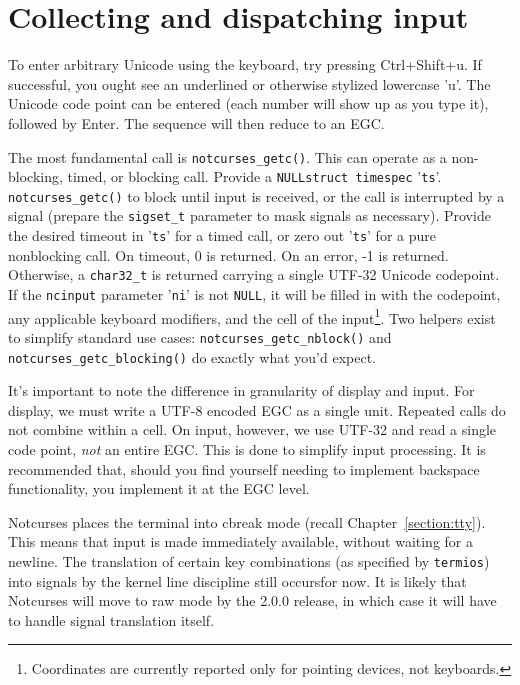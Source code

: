 \section{Collecting and dispatching input}
\label{sec:input}

To enter arbitrary Unicode using the keyboard, try pressing Ctrl+Shift+u. If
successful, you ought see an underlined or otherwise stylized lowercase 'u'.
The Unicode code point can be entered (each number will show up as you type it),
followed by Enter. The sequence will then reduce to an EGC.

The most fundamental call is \texttt{notcurses\_getc()}. This can operate as a
non-blocking, timed, or blocking call. Provide a \texttt{NULL}\texttt{struct timespec} '\texttt{ts}'.
\texttt{notcurses\_getc()} to block until input is received, or the call is
interrupted by a signal (prepare the \texttt{sigset\_t} parameter to mask signals
as necessary). Provide the desired timeout in '\texttt{ts}' for a timed call,
or zero out '\texttt{ts}' for a pure nonblocking call. On timeout, 0 is returned.
On an error, -1 is returned. Otherwise, a \texttt{char32\_t} is returned carrying
a single UTF-32 Unicode codepoint. If the \texttt{ncinput} parameter '\texttt{ni}'
is not \texttt{NULL}, it will be filled in with the codepoint, any applicable
keyboard modifiers, and the cell of the input\footnote{Coordinates are currently
reported only for pointing devices, not keyboards.}. Two helpers exist to simplify
standard use cases: \texttt{notcurses\_getc\_nblock()} and \texttt{notcurses\_getc\_blocking()}
do exactly what you'd expect.

It's important to note the difference in granularity of display and input. For
display, we must write a UTF-8 encoded EGC as a single unit. Repeated calls do
not combine within a cell. On input, however, we use UTF-32 and read a single
code point, \textit{not} an entire EGC. This is done to simplify input
processing. It is recommended that, should you find yourself needing to
implement backspace functionality, you implement it at the EGC level.

Notcurses places the terminal into cbreak mode (recall Chapter~\ref{section:tty}).
This means that input is made immediately available, without waiting for a newline.
The translation of certain key combinations (as specified by \texttt{termios})
into signals by the kernel line discipline still occurs\textellipsis for now.
It is likely that Notcurses will move to raw mode by the 2.0.0 release, in
which case it will have to handle signal translation itself.

